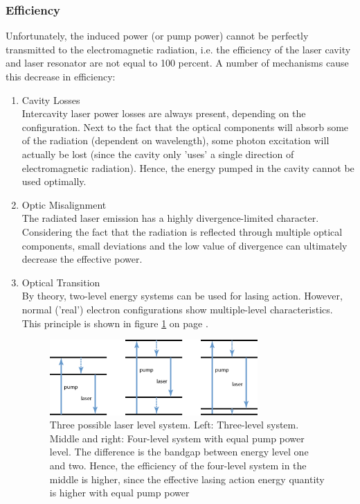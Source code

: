 	\subsubsection{Efficiency}
Unfortunately, the induced power (or pump power) cannot be perfectly transmitted to the electromagnetic radiation, i.e. the efficiency of the \acs{laser} cavity and \acs{laser} resonator are not equal to 100 percent. A number of mechanisms cause this decrease in efficiency:
	\begin{enumerate}
		\item{Cavity Losses}\\
Intercavity \acs{laser} power losses are always present, depending on the configuration. Next to the fact that the optical components will absorb some of the radiation (dependent on wavelength), some photon excitation will actually be lost (since the cavity only 'uses' a single direction of electromagnetic radiation). Hence, the energy pumped in the cavity cannot be used optimally. 
		\item{Optic Misalignment}\\
The radiated \acs{laser} emission has a highly divergence-limited character. Considering the fact that the radiation is reflected through multiple optical components, small deviations and the low value of divergence can ultimately decrease the effective power.
		\item{Optical Transition}\\
By theory, two-level energy systems can be used for lasing action. However, normal ('real') electron configurations show multiple-level characteristics. This principle is shown in figure \ref{fig:4_level_system} on page \pageref{fig:4_level_system}.

\begin{figure}[ht!]
\centering
\includegraphics[width=0.75\textwidth]{chapters/img/4_level_system.png}
\caption{Three possible laser level system. Left: Three-level system. Middle and right: Four-level system with equal pump power level. The difference is the bandgap between energy level one and two. Hence, the efficiency of the four-level system in the middle is higher, since the effective lasing action energy quantity is higher with equal pump power}
\label{fig:4_level_system}
\end{figure}
  
	\end{enumerate} 

